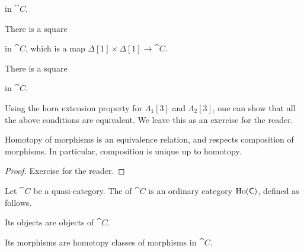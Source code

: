 \begin{definition}
\begin{itms}
        \enspace in $\cat C$.
        \item There is a square \enspace
        \enspace in $\cat C$, which is a map $\Delta[1]\times\Delta[1]\to\cat C$.
        \item There is a square \enspace
        \enspace in $\cat C$.
    \end{itms}
\end{definition}

Using the horn extension property for $\Lambda_1[3]$ and $\Lambda_2[3]$,
one can show that all the above conditions are equivalent.
We leave this as an exercise for the reader.

\begin{proposition}
    Homotopy of morphisms is an equivalence relation,
    and respects composition of morphisms.
    In particular, composition is unique up to homotopy.
\end{proposition}

\begin{proof}
    Exercise for the reader.
\end{proof}

\begin{definition}
    Let $\cat C$ be a quasi-category.
    The  of $\cat C$
    is an ordinary category $\operatorname{Ho}(\mathsf{C})$, defined as follows.
    \begin{itms}
        \item Its objects are objects of $\cat C$.
        \item Its morphisms are homotopy classes of morphisms in $\cat C$.
    \end{itms}
\end{definition}

